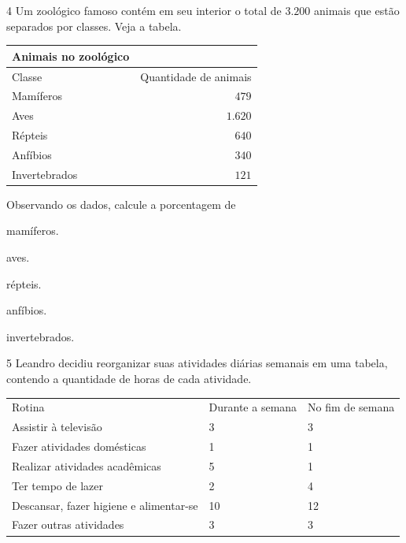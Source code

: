 {{{{\num{4}  Um zoológico famoso contém em seu interior o total de $3.200$ animais
que estão separados por classes. Veja a tabela.

\begin{table}[h]\centering
\begin{tabular}[]{lr}
\toprule
Animais no zoológico &\\
\midrule
Classe & Quantidade de animais\\
Mamíferos & $479$\\
Aves & $1.620$\\
Répteis & $640$\\
Anfíbios & $340$\\
Invertebrados & $121$\\
\bottomrule
\end{tabular}
\end{table}

Observando os dados, calcule a porcentagem de

\begin{escolha}
\item mamíferos.

\item aves.

\item répteis.

\item anfíbios.

\item invertebrados.

\end{escolha}

\num{5}  Leandro decidiu reorganizar suas atividades diárias semanais em uma
tabela, contendo a quantidade de horas de cada atividade.

\begin{table}[H]\centering
\begin{tabular}{lll}
Rotina                                  & Durante a semana & No fim de semana \\
Assistir à televisão                    & 3                & 3                \\
Fazer atividades domésticas             & 1                & 1                \\
Realizar atividades acadêmicas          & 5                & 1                \\
Ter tempo de lazer                      & 2                & 4                \\
Descansar, fazer higiene e alimentar-se & 10               & 12               \\
Fazer outras atividades                 & 3                & 3               
\end{tabular}
\end{table}

}}}}
